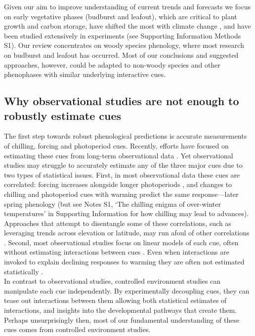 \documentclass[11pt,letter]{article}
\begin{document}
Given our aim to improve understanding of current trends and forecasts we focus on early vegetative phases (budburst and leafout), which are critical to plant growth and carbon storage, have shifted the most with climate change \citep{Cleland:2007or}, and have been studied extensively in experiments (see Supporting Information Methods S1). Our review concentrates on woody species phenology, where most research on budburst and leafout has occurred. Most of our conclusions and suggested approaches, however, could be adapted to non-woody species and other phenophases with similar underlying interactive cues. 

\subsection{Why observational studies are not enough to robustly estimate cues}
The first step towards robust phenological predictions is accurate measurements of chilling, forcing and photoperiod cues. Recently, efforts have focused on estimating these cues from long-term observational data \citep[e.g.,][]{lued2013diff}. Yet observational studies may struggle to accurately estimate any of the three major cues due to two types of statistical issues. First, in most observational data these cues are correlated: forcing increases alongside longer photoperiods \citep{sarahailene2020}, and changes to chilling and photoperiod cues with warming predict the same response---later spring phenology (but see Notes S1, `The chilling enigma of over-winter temperatures' in Supporting Information for how chilling may lead to advances). Approaches that attempt to disentangle some of these correlations, such as leveraging trends across elevation or latitude, may run afoul of other correlations \citep[][]{tansey2017}. Second, most observational studies focus on linear models of each cue, often without estimating interactions between cues \citep{visser2001,polgar2014}. Even when interactions are invoked to explain declining responses to warming they are often not estimated statistically \citep[e.g.,][]{fu2015}.\\

In contrast to observational studies, controlled environment studies can manipulate each cue independently. By experimentally decoupling cues, they can tease out interactions between them allowing both statistical estimates of interactions, and insights into the developmental pathways that create them. Perhaps unsurprisingly then, most of our fundamental understanding of these cues comes from controlled environment studies.\\
\end{document}
